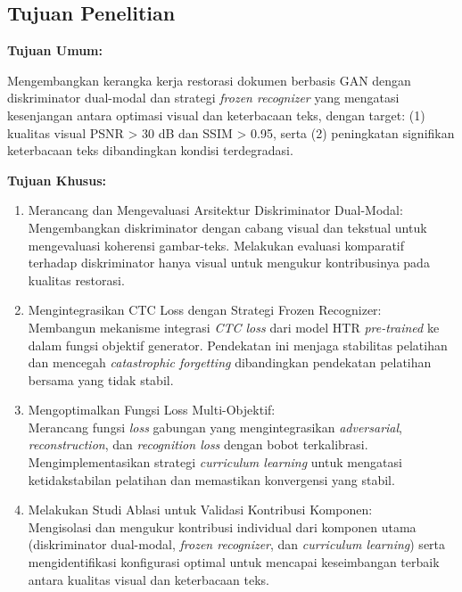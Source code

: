 \documentclass[12pt,a4paper]{book}
\begin{document}
\subsection{Tujuan Penelitian}
\label{subsec:tujuan-penelitian}

\textbf{Tujuan Umum:}

Mengembangkan kerangka kerja restorasi dokumen berbasis GAN dengan diskriminator dual-modal dan strategi \textit{frozen recognizer} yang mengatasi kesenjangan antara optimasi visual dan keterbacaan teks, dengan target: (1) kualitas visual PSNR > 30 dB dan SSIM > 0.95, serta (2) peningkatan signifikan keterbacaan teks dibandingkan kondisi terdegradasi.

\vspace{0.8em}
\textbf{Tujuan Khusus:}

\begin{enumerate}[label=\textbf{T\arabic*:}, leftmargin=1cm]
    \item Merancang dan Mengevaluasi Arsitektur Diskriminator Dual-Modal: \\
    Mengembangkan diskriminator dengan cabang visual dan tekstual untuk mengevaluasi koherensi gambar-teks. Melakukan evaluasi komparatif terhadap diskriminator hanya visual untuk mengukur kontribusinya pada kualitas restorasi.

    \item Mengintegrasikan CTC Loss dengan Strategi Frozen Recognizer: \\
    Membangun mekanisme integrasi \textit{CTC loss} dari model HTR \textit{pre-trained} ke dalam fungsi objektif generator. Pendekatan ini menjaga stabilitas pelatihan dan mencegah \textit{catastrophic forgetting} dibandingkan pendekatan pelatihan bersama yang tidak stabil.

    \item Mengoptimalkan Fungsi Loss Multi-Objektif: \\
    Merancang fungsi \textit{loss} gabungan yang mengintegrasikan \textit{adversarial}, \textit{reconstruction}, dan \textit{recognition loss} dengan bobot terkalibrasi. Mengimplementasikan strategi \textit{curriculum learning} untuk mengatasi ketidakstabilan pelatihan dan memastikan konvergensi yang stabil.

    \item Melakukan Studi Ablasi untuk Validasi Kontribusi Komponen: \\
    Mengisolasi dan mengukur kontribusi individual dari komponen utama (diskriminator dual-modal, \textit{frozen recognizer}, dan \textit{curriculum learning}) serta mengidentifikasi konfigurasi optimal untuk mencapai keseimbangan terbaik antara kualitas visual dan keterbacaan teks.
\end{enumerate}
\end{document}
